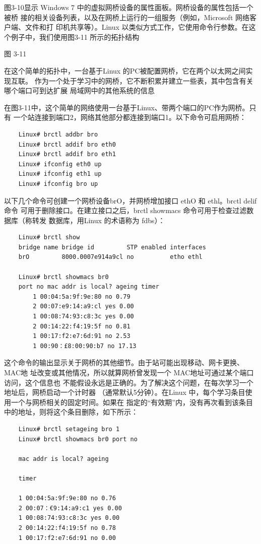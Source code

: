 图3-10显示 Windows 7 中的虚拟网桥设备的属性面板。网桥设备的属性包括一个被桥
接的相关设备列表，以及在网桥上运行的一组服务（例如，Microsoft 网络客户端、文件和打
印机共享等）。Linux 以类似方式工作，它使用命令行参数。在这个例子中，我们使用图3-11
所示的拓扑结构

图 3-11

在这个简单的拓扑中，一台基于Linux 的PC被配置网桥，它在两个以太网之间实现互联。
作为一个处于学习中的网桥，它不断积累并建立一些表，其中包含有关哪个端口可到达扩展
局域网中的其他系统的信息

在图3-11中，这个简单的网络使用一台基于Linux、带两个端口的PC作为网桥。只有
一个站连接到端口2，网络其他部分都连接到端口1。以下命令可启用网桥：
\begin{verbatim}
    Linux# brctl addbr bro
    Linux# brctl addif bro eth0
    Linux# brctl addif bro eth1
    Linux# ifconfig eth0 up
    Linux# ifconfig eth1 up
    Linux# ifconfig bro up
\end{verbatim}

以下几个命令可创建一个网桥设备brO，并网桥增加接口 ethO 和 ethl。brctl delif 命令
可用于删除接口。在建立接口之后，brctl showmacs 命令可用于检查过滤数据库（称转发
数据库，用Linux 的术语称为 fdbs）：

\begin{verbatim}
    Linux# brctl show
    bridge name bridge id         STP enabled interfaces
    brO         8000.0007e914a9cl no          etho ethl
    
    Linux# brctl showmacs br0
    port no mac addr is local? ageing timer
        1 00:04:5a:9f:9e:80 no 0.79
        2 00:07:e9:14:a9:cl yes 0.00
        1 00:08:74:93:c8:3c yes 0.00
        2 00:14:22:f4:19:5f no 0.81
        1 00:17:f2:e7:6d:91 no 2.53
        1 00:90：£8:00:90:b7 no 17.13
\end{verbatim}

这个命令的输出显示关于网桥的其他细节。由于站可能出现移动、网卡更换、MAC地
址改变或其他情况，所以就算网桥曾发现一个 MAC地址可通过某个端口访问，这个信息也
不能假设永远是正确的。为了解决这个问题，在每次学习一个地址后，网桥启动一个计时器
（通常默认5分钟）。在Linux 中，每个学习条目使用一个与网桥相关的固定时间。如果在
指定的“有效期”内，没有再次看到该条目中的地址，则将这个条目删除，如下所示：

\begin{verbatim}
    Linux# brctl setageing bro 1
    Linux# brctl showmacs br0 port no
    
    mac addr is local? ageing
    
    timer
    
    1 00:04:5a:9f:9e:80 no 0.76
    2 00:07：€9:14:a9:c1 yes 0.00
    1 00:08:74:93:c8:3c yes 0.00
    2 00:14:22:f4:19:5f no 0.78
    1 00:17:f2:e7:6d:91 no 0.00
\end{verbatim}

